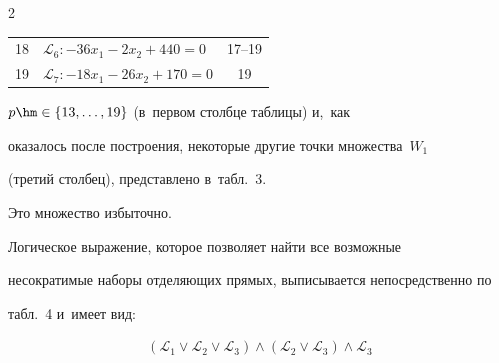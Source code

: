 \begin{multicols}{2}
{\begin{center}
\begin{tabular}{|c|l|c|}
18 & $\mathcal{L}_6: -36x_1 - 2x_2 + 440 = 0 $ & 17--19  \\




19 & $\mathcal{L}_7: -18x_1 - 26x_2 + 170 = 0 $ & 19  \\


\hline


\end{tabular}


\end{center}


}







\vspace*{9pt}























\noindent   


$p \hm\in \{13,\dots,19\}$ (в~первом столбце таблицы) и,~как 


оказалось после построения, некоторые другие точки множества~$W_1$ 


(третий столбец), представлено в~табл.~3. 


Это множество избыточно.


Логическое выражение, которое позволяет найти все возможные 


несократимые наборы отделяющих прямых,  выписывается непосредственно по 


табл.~4 и~имеет вид:





\vspace*{-2pt}





\noindent


\begin{multline*}


(\mathcal{ L}_1 \vee \mathcal{ L}_2 \vee \mathcal{ L}_3)


\wedge (\mathcal{ L}_2 \vee \mathcal{ L}_3)\wedge \mathcal{ L}_3 



\end{multline*}
\end{multicols}
